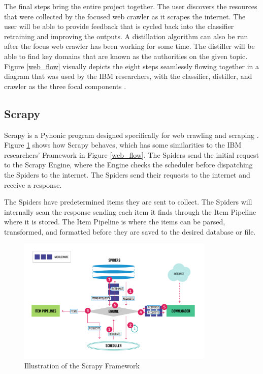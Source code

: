 \documentclass[5p,authoryear]{elsarticle}
\begin{document}
The final steps bring the entire project together. The user discovers the resources that were collected by the focused web crawler as it scrapes the internet. The user will be able to provide feedback that is cycled back into the classifier retraining and improving the outputs. A distillation algorithm can also be run after the focus web crawler has been working for some time. The distiller will be able to find key domains that are known as the authorities on the given topic. Figure \ref{web_flow} visually depicts the eight steps seamlessly flowing together in a diagram that was used by the IBM researchers, with the classifier, distiller, and crawler as the three focal components \citep{focused}.


\subsection{Scrapy}\label{Scrapy}

Scrapy is a Pyhonic program designed specifically for web crawling and scraping \citep{scrapy}. Figure \ref{Scrapy_Framework} shows how Scrapy behaves, which has some similarities to the IBM researchers' Framework in Figure \ref{web_flow}. The Spiders send the initial request to the Scrapy Engine, where the Engine checks the scheduler before dispatching the Spiders to the internet. The Spiders send their requests to the internet and receive a response. 

The Spiders have predetermined items they are sent to collect. The Spiders will internally scan the response sending each item it finds through the Item Pipeline where it is stored. The Item Pipeline is where the items can be parsed, transformed, and formatted before they are saved to the desired database or file.

\begin{figure}[!htb] \centering
	\includegraphics[width=3.7in]{figures/Scrapy_Framework.png}
	\caption[]{Illustration of the Scrapy Framework} 
	\label{Scrapy_Framework} 
\end{figure}
\end{document}
